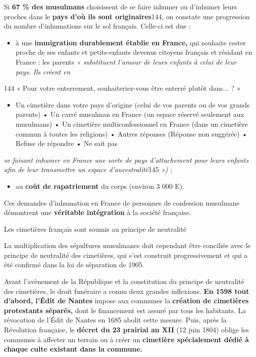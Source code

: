 Si \textbf{67 \% des musulmans} choisissent de se faire inhumer ou
d'inhumer leurs proches dans le \textbf{pays d'où ils sont
originaires}144, on constate une progression du nombre d'inhumations sur
le sol français. Celle-ci est due :


\begin{itemize}
\item
  à une \textbf{immigration durablement établie en France,} qui souhaite
  rester proche de ses enfants et petits-enfants devenus citoyens
  français et résidant en France : les parents \emph{« substituent
  l'amour de leurs enfants à celui de leur pays. Ils créent en}
\end{itemize}


144 « Pour votre enterrement, souhaiteriez-vous être enterré plutôt
dans... ? »


\begin{itemize}
\item
  Un cimetière dans votre pays d'origine (celui de vos parents ou de vos
  grands parents) • Un carré musulman en France (un espace réservé
  seulement aux musulmans) • Un cimetière multiconfessionnel en France
  (dans un cimetière commun à toutes les religions) • Autres réponses
  (Réponse non suggérée) • Refuse de répondre • Ne sait pas
\end{itemize}




\emph{se faisant inhumer en France une sorte de pays d'attachement pour
leurs enfants afin de leur transmettre un espace d'ancestralité}145
\emph{»)} ;


\begin{itemize}
\item
  au \textbf{coût de rapatriement} du corps (environ 3 000 E).
\end{itemize}


Ces demandes d'inhumation en France de personnes de confession musulmane
démontrent une \textbf{véritable intégration} à la société française.


Les cimetières français sont soumis au principe de neutralité

La multiplication des sépultures musulmanes doit cependant être
conciliée avec le principe de neutralité des cimetières, qui s'est
construit progressivement et qui a été confirmé dans la loi de
séparation de 1905.


Avant l'avènement de la République et la constitution du principe de
neutralité des cimetières, le droit funéraire a connu deux grandes
inflexions. \textbf{En 1598 tout d'abord, l'Édit de Nantes} impose aux
communes la \textbf{création de cimetières protestants séparés,} dont le
financement est assuré par tous les habitants. La révocation de l'Édit
de Nantes en 1685 abolit cette mesure. Puis, après la Révolution
française, le \textbf{décret du 23 prairial an XII} (12 juin 1804)
oblige les communes à affecter un terrain ou à créer un
\textbf{cimetière spécialement dédié à chaque culte existant dans la
commune.}

